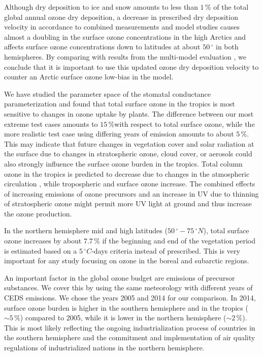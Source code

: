 \documentclass[gmd, manuscript]{copernicus}
\begin{document}
Although dry deposition to ice and snow amounts to less than $1\,\unit{\%}$ of the total global annual ozone dry deposition, a decrease in prescribed dry deposition velocity in accordance to combined measurements and model studies \citep{ACP:Helmig2007} causes almost a doubling in the surface ozone concentrations in the high Arctics and affects surface ozone concentrations down to latitudes at about $50\,\unit{^\circ}$ in both hemispheres. By comparing with results from the multi-model evaluation \citep{ACP:Hardacre2015}, we conclude that it is important to use this updated ozone dry deposition velocity to counter an Arctic surface ozone low-bias in the model.

We have studied the parameter space of the stomatal conductance parameterization and found that total surface ozone in the tropics is most sensitive to changes in ozone uptake by plants. The difference between our most extreme test cases amounts to $15\,\unit{\%}$with respect to total surface ozone, while the more realistic test case using differing years of emission amounts to about $5\,\unit{\%}$. This may indicate that future changes in vegetation cover and solar radiation at the surface due to changes in stratospheric ozone, cloud cover, or aerosols could also strongly influence the surface ozone burden in the tropics. Total column ozone in the tropics is predicted to decrease due to changes in the atmospheric circulation \citep[e.g.,][]{WMO2014}, while tropospheric and surface ozone increase. The combined effects of increasing emissions of ozone precursors and an increase in UV due to thinning of stratospheric ozone might permit more UV light at ground and thus increase the ozone production.

In the northern hemisphere mid and high latitudes ($50\,\unit{^\circ}-75\,\unit{^\circ N}$), total surface ozone increases by about $7.7\,\unit{\%}$ if the beginning and end of the vegetation period is estimated based on a $5\,\unit{^\circ C}$-days criteria instead of prescribed. This is very important for any study focusing on ozone in the boreal and subarctic regions.

An important factor in the global ozone budget are emissions of precursor substances. We cover this by using the same meteorology with different years of CEDS emissions. We chose the years 2005 and 2014 for our comparison. In 2014, surface ozone burden is higher in the southern hemisphere and in the tropics ($\sim 5\,\unit{\%}$) compared to 2005, while it is lower in the northern hemisphere ($\sim 2\,\unit{\%}$). This is most likely reflecting the ongoing industrialization process of countries in the southern hemisphere and the commitment and implementation of air quality regulations of industrialized nations in the northern hemisphere.
\end{document}
